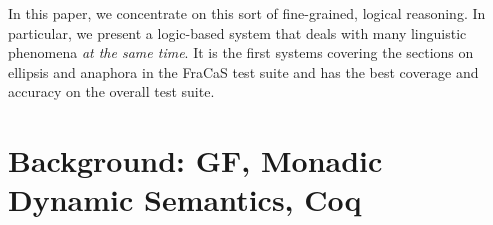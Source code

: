 \documentclass[11pt]{article}
\begin{document}
In this paper, we concentrate on this sort of fine-grained, logical
reasoning. In particular, we present a logic-based system that deals
with many linguistic phenomena \emph{at the same time}. It is the
first systems covering the sections on ellipsis and anaphora in the
FraCaS test suite and has the best coverage and accuracy on the
overall test suite.

\section{Background: GF, Monadic Dynamic Semantics, Coq}
\end{document}
